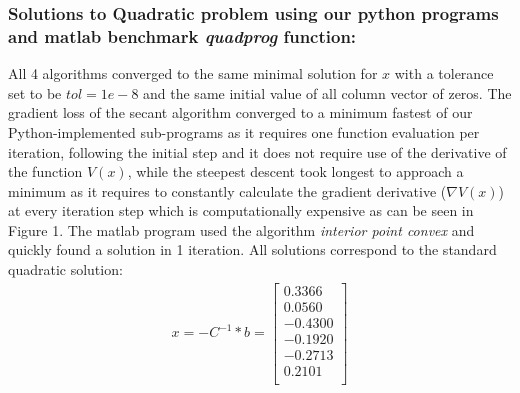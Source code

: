 \subsubsection{Solutions to Quadratic problem using our python programs and matlab benchmark \textit{quadprog} function: }
All 4 algorithms converged to the same minimal solution for $x$ with a tolerance set to be $tol =1e-8$ and the same initial value of all column vector of zeros. The gradient loss of the secant algorithm converged to a minimum fastest of our Python-implemented sub-programs as it requires one function evaluation per iteration, following the initial step and it does not require use of the derivative of the function $V(x)$,
while the steepest descent took longest to approach a minimum as it requires to constantly calculate the gradient derivative ($\nabla V(x)$) at every iteration step which is computationally expensive as can be seen in Figure 1. The matlab program used the algorithm \textit{ interior point convex} and quickly found a solution in 1 iteration. \newline All solutions correspond to the standard quadratic solution: 
\begin{align}
    x = -C^{-1}*b = \begin{bmatrix}
     0.3366 \\
    0.0560 \\
   -0.4300 \\
   -0.1920 \\
   -0.2713 \\ 
    0.2101 \\
    \end{bmatrix} 
\end{align}
